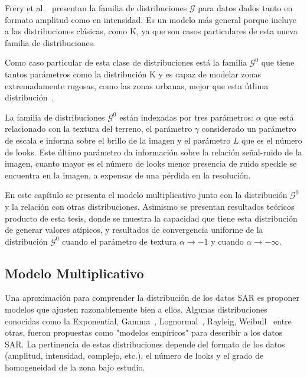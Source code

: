 Frery et al.~\cite{Frery97,Frery99} presentan la familia de distribuciones $\mathcal{G}$ para datos dados tanto en formato amplitud como en intensidad. Es un modelo más general porque incluye a las distribuciones clásicas, como $\mathrm{K}$, ya que son casos particulares de esta nueva familia de distribuciones.

Como caso particular de esta clase de distribuciones está la familia $\mathcal{G}^0$ que tiene tantos parámetros como la distribución $\mathrm{K}$ y es capaz de modelar zonas extremadamente rugosas, como las zonas urbanas, mejor que esta útlima distribución~\cite{Mejail99}. 

La familia de distribuciones $\mathcal{G}^0$ están indexadas por tres parámetros: $\alpha$ que está relacionado con la textura del terreno, el parámetro $\gamma$ considerado un parámetro de escala e informa sobre el brillo de la imagen y el parámetro $L$ que es el número de looks. Este último parámetro da información sobre la relación señal-ruido de la imagen, cuanto mayor es el número de looks menor presencia de ruido speckle se encuentra en la imagen, a expensas de una pérdida en la resolución.

En este capítulo se presenta el modelo multiplicativo junto con la distribución $\mathcal{G}^0$ y la relación con otras distribuciones. Asimismo se presentan resultados teóricos producto de esta tesis, donde se muestra la capacidad que tiene esta distribución de generar valores atípicos, y resultados de convergencia uniforme de la distribución $\mathcal{G}^0$ cuando el parámetro de textura $\alpha \longrightarrow -1$ y cuando $\alpha \longrightarrow -\infty$.


\subsection{Modelo Multiplicativo}
\label{ModeloMultiplicativo}

Una aproximación para comprender la distribución de los datos SAR es proponer modelos que ajusten razonablemente bien a ellos. Algunas distribuciones conocidas como la Exponential, Gamma~\cite{FreryLibro2019}, Lognormal~\cite{oliverquegan98,Yanasse93}, Rayleig, Weibull~\cite{Lee2009,Yanasse93} entre otras, fueron propuestas como "modelos empíricos" para describir a los datos SAR. La pertinencia de estas distribuciones depende del formato de los datos (amplitud, intensidad, complejo, etc.), el número de looks y el grado de homogeneidad de la zona bajo estudio.

